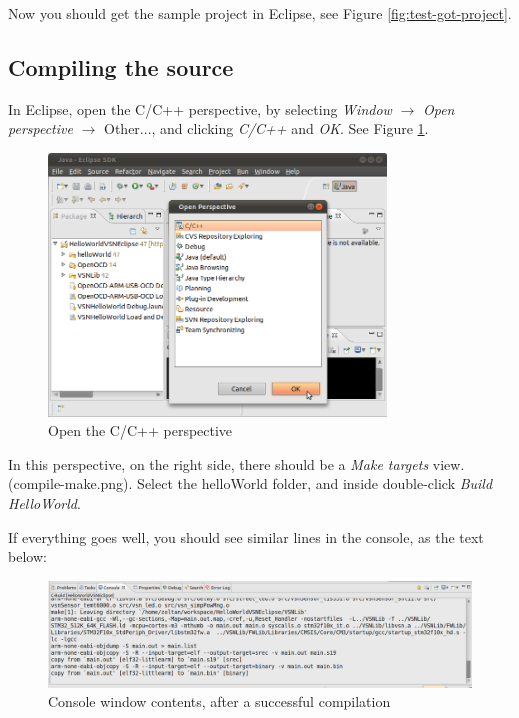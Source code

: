 \documentclass[a4paper, 10pt]{article}
\begin{document}
Now you should get the sample project in Eclipse, see
Figure \ref{fig:test-got-project}.

\subsection{Compiling the source}

In Eclipse, open the C/C++ perspective,  by selecting \emph{Window} $\rightarrow$
\emph{Open perspective} $\rightarrow$ Other...,
and clicking \emph{C/C++} and \emph{OK}.
See Figure \ref{fig:compile-c-perspective}.

    \begin{figure}[H]
    \centering
        \includegraphics[width=0.8\textwidth]{./png-install-guide/compile-c-perspective.png}
        \caption{Open the C/C++ perspective}
        \label{fig:compile-c-perspective}
    \end{figure}

In this perspective,
on the right side, there should be a \emph{Make targets} view. (compile-make.png).
Select the helloWorld folder, and inside double-click \emph{Build HelloWorld}.

If everything goes well, you should see similar lines in the console, as the text below:

    \begin{figure}[H]
    \centering
        \includegraphics[width=\textwidth]{./png-install-guide/compile-result.png}
        \caption{Console window contents, after a successful compilation}
        \label{fig:compile-result}
    \end{figure}
\end{document}
